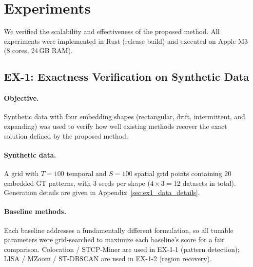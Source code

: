 \section{Experiments}\label{sec:experiments}

We verified the scalability and effectiveness of the proposed method.
All experiments were implemented in Rust (release build)
and executed on Apple M3 (8 cores, 24\,GB RAM).

\subsection{EX-1: Exactness Verification on Synthetic Data}
\label{sec:ex1}\label{sec:ex1_1}

\paragraph{Objective.}
Synthetic data with four embedding shapes
(rectangular, drift, intermittent, and expanding)
was used to verify how well existing methods recover
the exact solution defined by the proposed method.

\paragraph{Synthetic data.}
A grid with $T{=}100$ temporal and $S{=}100$ spatial grid points containing 20 embedded GT patterns,
with 3 seeds per shape ($4 \times 3 = 12$ datasets in total).
Generation details are given in Appendix~\ref{sec:ex1_data_details}.

\paragraph{Baseline methods.}
Each baseline addresses a fundamentally different formulation,
so all tunable parameters were grid-searched to maximize each baseline's score for a fair comparison.
Colocation / STCP-Miner are used in EX-1-1 (pattern detection);
LISA / MZoom / ST-DBSCAN are used in EX-1-2 (region recovery).

